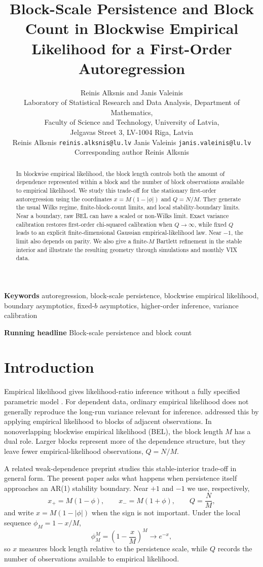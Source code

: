 \documentclass[12pt]{article}
\title{Block-Scale Persistence and Block Count in Blockwise Empirical Likelihood for a First-Order Autoregression}
\author{Reinis Alksnis and Janis Valeinis\\[0.5ex]
\small Laboratory of Statistical Research and Data Analysis, Department of Mathematics,\\
\small Faculty of Science and Technology, University of Latvia,\\
\small Jelgavas Street 3, LV-1004 Riga, Latvia\\[0.5ex]
\small Reinis Alksnis \texttt{reinis.alksnis@lu.lv} \quad Janis Valeinis \texttt{janis.valeinis@lu.lv}\\[0.5ex]
\small Corresponding author Reinis Alksnis}
\date{}
\theoremstyle{remark}
\begin{document}
\maketitle

\begin{abstract}
In blockwise empirical likelihood, the block length controls both the amount of dependence represented within a block and the number of block observations available to empirical likelihood. We study this trade-off for the stationary first-order autoregression using the coordinates $x=M(1-|\phi|)$ and $Q=N/M$. They generate the usual Wilks regime, finite-block-count limits, and local stability-boundary limits. Near a boundary, raw BEL can have a scaled or non-Wilks limit. Exact variance calibration restores first-order chi-squared calibration when $Q\to\infty$, while fixed $Q$ leads to an explicit finite-dimensional Gaussian empirical-likelihood law. Near $-1$, the limit also depends on parity. We also give a finite-$M$ Bartlett refinement in the stable interior and illustrate the resulting geometry through simulations and monthly VIX data.
\end{abstract}

\noindent\textbf{Keywords} autoregression, block-scale persistence, blockwise empirical likelihood, boundary asymptotics, fixed-$b$ asymptotics, higher-order inference, variance calibration

\smallskip
\noindent\textbf{Running headline} Block-scale persistence and block count

\section{Introduction}
Empirical likelihood gives likelihood-ratio inference without a fully specified parametric model \citep{Owen:1988,Owen:2001}. For dependent data, ordinary empirical likelihood does not generally reproduce the long-run variance relevant for inference. \citet{Kitamura:1997} addressed this by applying empirical likelihood to blocks of adjacent observations. In nonoverlapping blockwise empirical likelihood (BEL), the block length $M$ has a dual role. Larger blocks represent more of the dependence structure, but they leave fewer empirical-likelihood observations, $Q=N/M$.

A related weak-dependence preprint \citep{Alksnis.Valeinis:2026} studies this stable-interior trade-off in general form. The present paper asks what happens when persistence itself approaches an AR(1) stability boundary. Near $+1$ and $-1$ we use, respectively,
\[
x_+=M(1-\phi),
\qquad
x_-=M(1+\phi),
\qquad
Q=\frac{N}{M},
\]
and write $x=M(1-|\phi|)$ when the sign is not important. Under the local sequence $\phi_M=1-x/M$,
\[
\phi_M^M=\left(1-\frac{x}{M}\right)^M\longrightarrow e^{-x},
\]
so $x$ measures block length relative to the persistence scale, while $Q$ records the number of observations available to empirical likelihood.
\end{document}
